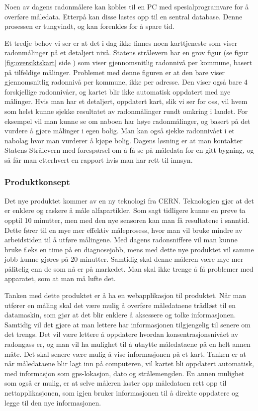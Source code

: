 Noen av dagens radonmålere kan kobles til en PC med spesialprogramvare for å overføre måledata. Etterpå kan disse lastes opp til en sentral database. Denne prosessen er tungvindt, og kan forenkles for å spare tid.


Et tredje behov vi ser er at det i dag ikke finnes noen karttjeneste som viser radonmålinger på et detaljert nivå. Statens strålevern har en grov figur (se figur \ref{fig:oversiktskart} side \pageref{fig:oversiktskart}) som viser gjennomsnitlig radonnivå per kommune, basert på tilfeldige målinger. Problemet med denne figuren er at den bare viser gjennomsnitlig radonnivå per kommune, ikke per adresse. Den viser også bare 4 forskjellige radonnivåer, og kartet blir ikke automatisk oppdatert med nye målinger. Hvis man har et detaljert, oppdatert kart, slik vi ser for oss, vil hvem som helst kunne sjekke resultatet av radonmålinger rundt omkring i landet. For eksempel vil man kunne se om naboen har høye radonmålinger, og basert på det vurdere å gjøre målinger i egen bolig. Man kan også sjekke radonnivået i et nabolag hvor man vurderer å kjøpe bolig. Dagens løsning er at man kontakter Statens Strålevern med forespørsel om å få se på måledata for en gitt bygning, og så får man etterhvert en rapport hvis man har rett til innsyn.


\subsubsection{Produktkonsept}

Det nye produktet kommer av en ny teknologi fra CERN. Teknologien gjør at det er enklere og raskere å måle alfapartikler. Som sagt tidligere kunne en prøve ta opptil 10 minutter, men med den nye sensoren kan man få resultatene i sanntid. Dette fører til en mye mer effektiv måleprosess, hvor man vil bruke mindre av arbeidstiden til å utføre målingene. Med dagens radonsniffere vil man kunne bruke f.eks en time på en diagnosejobb, mens med dette nye produktet vil samme jobb kunne gjøres på 20 minutter. Samtidig skal denne måleren være mye mer pålitelig enn de som nå er på markedet. Man skal ikke trenge å få problemer med apparatet, som at man må lufte det.	

Tanken med dette produktet er å ha en webapplikasjon til produktet. Når man utfører en måling skal det være mulig å overføre måledataene trådløst til en datamaskin, som gjør at det blir enklere å aksessere og tolke informasjonen. Samtidig vil det gjøre at man lettere har informasjonen tilgjengelig til senere om det trengs. Det vil være lettere å oppdatere hvordan konsentrasjonsnivået av radongass er, og man vil ha mulighet til å utnytte måledataene på en helt annen måte. Det skal senere være mulig å vise informasjonen på et kart. Tanken er at når måledataene blir lagt inn på computeren, vil kartet bli oppdatert automatisk, med informasjon som gps-lokasjon, dato og strålemengden. En annen mulighet som også er mulig, er at selve måleren laster opp måledataen rett opp til nettapplikasjonen, som igjen bruker informasjonen til å direkte oppdatere og legge til den nye informasjonen.

